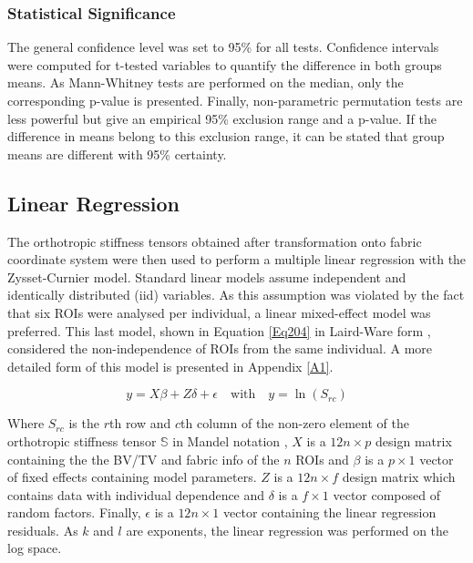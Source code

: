 \documentclass[a4paper,fleqn]{DC_ArtStyle}
\begin{document}
	\subsubsection{Statistical Significance}
	The general confidence level was set to 95\% for all tests. Confidence intervals were computed for t-tested variables to quantify the difference in both groups means. As Mann-Whitney tests are performed on the median, only the corresponding p-value is presented. Finally, non-parametric permutation tests are less powerful but give an empirical 95\% exclusion range and a p-value. If the difference in means belong to this exclusion range, it can be stated that group means are different with 95\% certainty.
	
	\subsection{Linear Regression}
	The orthotropic stiffness tensors obtained after transformation onto fabric coordinate system were then used to perform a multiple linear regression with the Zysset-Curnier model. Standard linear models assume independent and identically distributed (iid) variables. As this assumption was violated by the fact that six ROIs were analysed per individual, a linear mixed-effect model was preferred. This last model, shown in Equation \ref{Eq204} in Laird-Ware form \cite{Laird1982}, considered the non-independence of ROIs from the same individual. A more detailed form of this model is presented in Appendix \ref{A1}.
	
	\begin{equation}
	y = X \beta + Z \delta + \epsilon \quad \text{with} \quad y = \ln(S_{rc})
	\label{Eq204}
	\end{equation}
	
	Where $S_{rc}$ is the $r$th row and $c$th column of the non-zero element of the orthotropic stiffness tensor $\mathbb{S}$ in Mandel notation \cite{MANDEL1965}, $X$ is a $12 n \times p$ design matrix containing the the BV/TV and fabric info of the $n$ ROIs and $\beta$ is a $p \times 1$ vector of fixed effects containing model parameters. $Z$ is a $12 n \times f$ design matrix which contains data with individual dependence and $\delta$ is a $f \times 1$ vector composed of random factors. Finally, $\epsilon$ is a $12n \times 1$ vector containing the linear regression residuals. As $k$ and $l$ are exponents, the linear regression was performed on the log space.\\
	
\end{document}
